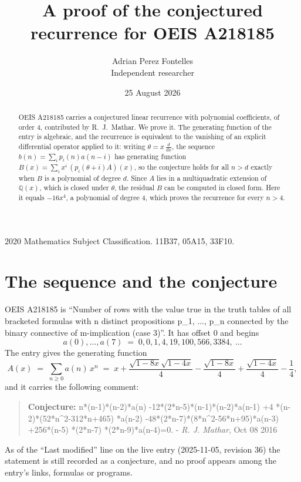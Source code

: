 \documentclass[11pt,a4paper]{article}
\title{A proof of the conjectured recurrence for OEIS A218185}
\author{Adrian Perez Fontelles\\ \small Independent researcher}
\date{25 August 2026}
\theoremstyle{plain}
\theoremstyle{definition}
\begin{document}
\maketitle

\begin{abstract}
OEIS A218185 carries a conjectured linear recurrence with polynomial coefficients, of
order 4, contributed by R.~J.~Mathar. We prove it. The generating function of the
entry is algebraic, and the recurrence is equivalent to the vanishing of an explicit
differential operator applied to it: writing $\theta=x\,\frac{d}{dx}$, the sequence
$b(n)=\sum_{i}p_{i}(n)a(n-i)$ has generating function
$B(x)=\sum_{i}x^{i}\,(p_{i}(\theta+i)A)(x)$, so the conjecture holds for all $n>d$ exactly
when $B$ is a polynomial of degree $d$. Since $A$ lies in a multiquadratic extension of
$\mathbb{Q}(x)$, which is closed under $\theta$, the residual $B$ can be computed in
closed form. Here it equals $- 16 x^{4}$, a polynomial of degree $4$, which proves
the recurrence for every $n>4$.
\end{abstract}

\noindent\small 2020 Mathematics Subject Classification. 11B37, 05A15, 33F10.\normalsize

\section{The sequence and the conjecture}

OEIS A218185 is ``Number of rows with the value true in the truth tables of all bracketed formulas with n distinct propositions p\_1, ..., p\_n connected by the binary connective of m-implication (case 3)''. It has offset $0$ and begins
\[
a(0),\dots,a(7)\;=\;0, 0, 1, 4, 19, 100, 566, 3384,\ \dots
\]
The entry gives the generating function
\begin{equation}\label{eq:gf}
A(x)\;=\;\sum_{n\ge 0} a(n)\,x^{n}\;=\;x + \frac{\sqrt{1 - 8 x} \sqrt{1 - 4 x}}{4} - \frac{\sqrt{1 - 8 x}}{4} + \frac{\sqrt{1 - 4 x}}{4} - \frac{1}{4} ,
\end{equation}
and it carries the following comment:
\begin{quote}\small
\textbf{Conjecture:} n*(n-1)*(n-2)*a(n) -12*(2*n-5)*(n-1)*(n-2)*a(n-1) +4 *(n-2)*(52*n\^{}2-312*n+465) *a(n-2) -48*(2*n-7)*(8*n\^{}2-56*n+95)*a(n-3) +256*(n-5) *(2*n-7) *(2*n-9)*a(n-4)=0. - \emph{R. J. Mathar}, Oct 08 2016
\end{quote}
As of the ``Last modified'' line on the live entry (2025-11-05, revision 36) the
statement is still recorded as a conjecture, and no proof appears among the entry's links,
formulas or programs.
\end{document}
